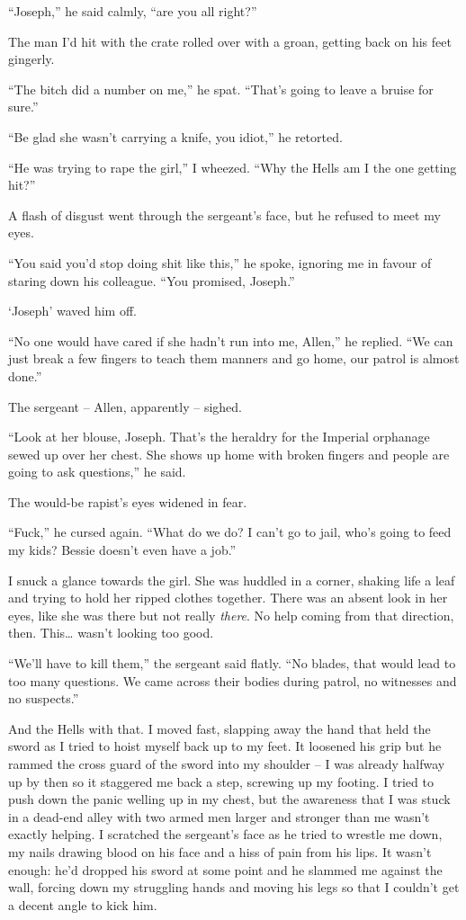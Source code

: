 \documentclass[12pt, openany]{book}
\begin{document}
“Joseph,” he said calmly, “are you all right?”

The man I’d hit with the crate rolled over with a groan, getting back on his feet gingerly.

“The bitch did a number on me,” he spat. “That’s going to leave a bruise for sure.”

“Be glad she wasn’t carrying a knife, you idiot,” he retorted.

“He was trying to rape the girl,” I wheezed. “Why the Hells am I the one getting hit?”

A flash of disgust went through the sergeant’s face, but he refused to meet my eyes.

“You said you’d stop doing shit like this,” he spoke, ignoring me in favour of staring down his colleague. “You promised, Joseph.”

‘Joseph’ waved him off.

“No one would have cared if she hadn’t run into me, Allen,” he replied. “We can just break a few fingers to teach them manners and go home, our patrol is almost done.”

The sergeant – Allen, apparently – sighed.

“Look at her blouse, Joseph. That’s the heraldry for the Imperial orphanage sewed up over her chest. She shows up home with broken fingers and people are going to ask questions,” he said.

The would-be rapist’s eyes widened in fear.

“Fuck,” he cursed again. “What do we do? I can’t go to jail, who’s going to feed my kids? Bessie doesn’t even have a job.”

I snuck a glance towards the girl. She was huddled in a corner, shaking life a leaf and trying to hold her ripped clothes together. There was an absent look in her eyes, like she was there but not really \textit{there}. No help coming from that direction, then. This… wasn’t looking too good.

“We’ll have to kill them,” the sergeant said flatly. “No blades, that would lead to too many questions. We came across their bodies during patrol, no witnesses and no suspects.”

And the Hells with that. I moved fast, slapping away the hand that held the sword as I tried to hoist myself back up to my feet. It loosened his grip but he rammed the cross guard of the sword into my shoulder – I was already halfway up by then so it staggered me back a step, screwing up my footing. I tried to push down the panic welling up in my chest, but the awareness that I was stuck in a dead-end alley with two armed men larger and stronger than me wasn’t exactly helping. I scratched the sergeant’s face as he tried to wrestle me down, my nails drawing blood on his face and a hiss of pain from his lips. It wasn’t enough: he’d dropped his sword at some point and he slammed me against the wall, forcing down my struggling hands and moving his legs so that I couldn’t get a decent angle to kick him.
\end{document}
